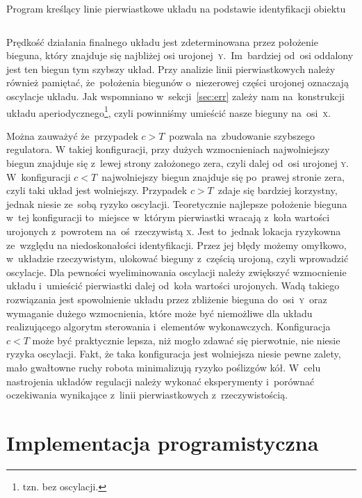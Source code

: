 \documentclass[11pt]{article}
\begin{document}
\begin{listing}[htb]
\caption{Program kreślący linie pierwiastkowe układu na podstawie identyfikacji obiektu}
\inputminted[firstline=1, lastline=32, frame=lines, linenos, breaklines]{matlab}{../Identification/Identification.m}
\label{lst:root_loc}
\end{listing}

Prędkość działania finalnego układu jest zdeterminowana przez położenie bieguna, który znajduje się najbliżej osi urojonej~\textsc{y}.~Im~bardziej od~osi oddalony jest ten biegun tym szybszy układ.
Przy analizie linii pierwiastkowych należy również pamiętać, że~położenia biegunów o~niezerowej części urojonej oznaczają oscylacje układu.
Jak wspomniano w~sekcji~\ref{sec:err} zależy nam na~konstrukcji układu aperiodycznego\footnote{tzn. bez oscylacji.}, czyli powinniśmy umieścić nasze bieguny na~osi~\textsc{x}.

Można zauważyć że~przypadek $ c > T $~pozwala na~zbudowanie szybszego regulatora.
W takiej konfiguracji, przy dużych wzmocnieniach najwolniejszy biegun znajduje się z~lewej strony założonego zera, czyli dalej od~osi urojonej \textsc{y}.
W~konfiguracji $ c < T $~najwolniejszy biegun znajduje się po~prawej stronie zera, czyli taki układ jest wolniejszy.
Przypadek $ c > T $~zdaje się bardziej korzystny, jednak niesie ze~sobą ryzyko oscylacji.
Teoretycznie najlepsze położenie bieguna w~tej konfiguracji to~miejsce w~którym pierwiastki wracają z~koła wartości urojonych z~powrotem na~oś~rzeczywistą \textsc{x}.
Jest to~jednak lokacja ryzykowna ze~względu na niedoskonałości identyfikacji.
Przez jej błędy możemy omyłkowo, w~układzie rzeczywistym, ulokować bieguny z~częścią urojoną, czyli wprowadzić oscylacje.
Dla pewności wyeliminowania oscylacji należy zwiększyć wzmocnienie układu i~umieścić pierwiastki dalej od~koła wartości urojonych.
Wadą takiego rozwiązania jest spowolnienie układu przez zbliżenie bieguna do~osi~\textsc{y}~oraz wymaganie dużego wzmocnienia, które może być niemożliwe dla układu realizującego algorytm sterowania i~elementów wykonawczych.
Konfiguracja $ c < T $ może być praktycznie lepsza, niż mogło zdawać się pierwotnie, nie niesie ryzyka oscylacji.
Fakt, że taka konfiguracja jest wolniejsza niesie pewne zalety, mało gwałtowne ruchy robota minimalizują ryzyko poślizgów kół.
W~celu nastrojenia układów regulacji należy wykonać eksperymenty i~porównać oczekiwania wynikające z~linii pierwiastkowych z~rzeczywistością.

\section{Implementacja programistyczna}
\end{document}
